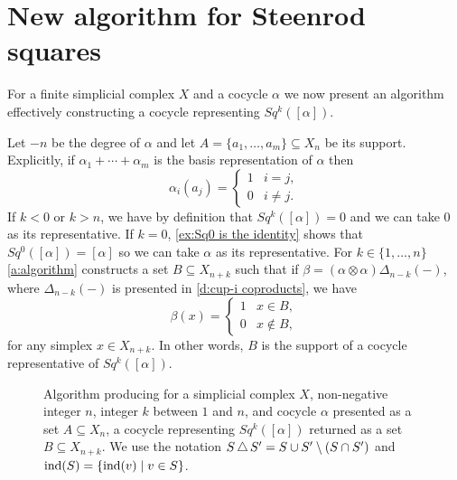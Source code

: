 
\section{New algorithm for Steenrod squares} \label{s:algorithm}


For a finite simplicial complex $X$ and a cocycle $\alpha$ we now present an algorithm effectively constructing a cocycle representing $Sq^k([\alpha])$.

Let $-n$ be the degree of $\alpha$ and let $A = \{a_1, \dots, a_m\} \subseteq X_n$ be its support.
Explicitly, if $\alpha_1 + \cdots + \alpha_m$ is the basis representation of $\alpha$ then
\begin{equation*}
\alpha_i(a_j) = \begin{cases}
1 & i=j, \\ 0 & i\neq j.
\end{cases}
\end{equation*}
If $k < 0$ or $k > n$, we have by definition that $Sq^k([\alpha]) = 0$ and we can take $0$ as its representative.
If $k = 0$, \cref{ex:Sq0 is the identity} shows that $Sq^0([\alpha]) = [\alpha]$ so we can take $\alpha$ as its representative.
For $k \in \{1, \dots, n\}$ \cref{a:algorithm} constructs a set $B \subseteq X_{n+k}$ such that if $\beta = (\alpha \otimes \alpha)\Delta_{n-k}(-)$, where $\Delta_{n-k}(-)$ is presented in \cref{d:cup-i coproducts}, we have
\begin{equation} \label{e:correctness}
\beta(x) =
\begin{cases}
1 & x \in B, \\
0 & x \not\in B,
\end{cases}
\end{equation}
for any simplex $x \in X_{n+k}$.
In other words, $B$ is the support of a cocycle representative of $Sq^k([\alpha])$.

\begin{figure}
	
	\caption{Algorithm producing for a simplicial complex $X$, non-negative integer $n$, integer $k$ between $1$ and $n$, and cocycle $\alpha$ presented as a set $A \subseteq X_n$, a cocycle representing $Sq^k([\alpha])$ returned as a set $B \subseteq X_{n+k}$.
	We use the notation $S \operatorname{\triangle} S^\prime = S \cup S^\prime \setminus (S \cap S^\prime)$ and $\mathrm{ind}(S) = \{\mathrm{ind}(v) \mid v \in S\}$.}
	\label{f:algorithm}
\end{figure}

